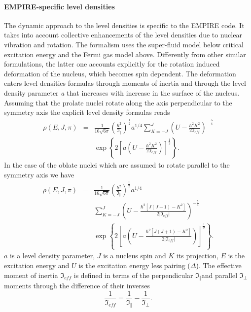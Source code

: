 \documentclass[twocolumn,amsmath,amssymb,10pt,groupedaddress,letter]{revtex4}
\begin{document}
\paragraph{EMPIRE-specific level densities}
The dynamic approach to the level densities
is specific to the EMPIRE code. It takes into account collective enhancements
of the level densities due to nuclear vibration and rotation. The
formalism uses the super-fluid model below critical excitation energy
and the Fermi gas model above. Differently from other
similar formulations, the latter one accounts explicitly for the rotation
induced deformation of the nucleus, which becomes spin dependent.
The deformation enters level densities
formulas through moments of inertia and through the level density
parameter \emph{a} that increases with increase in the surface of
the nucleus.
Assuming that the prolate nuclei rotate along the axis perpendicular
to the symmetry axis the explicit level density formulas reads
\begin{eqnarray}
\rho(E,J,\pi) & = & \frac{1}{16\sqrt{6\pi}}\left(\frac{\hbar^{2}}{\Im_{\Vert}}\right)^{\frac{1}{2}}a^{1/4}\sum_{K=-J}^{J}\left(U-\frac{\hbar^{2}K^{2}}{2\Im_{eff}}\right)^{-\frac{5}{4}}\nonumber \\
 &  & \exp\left\{ 2\left[a\left(U-\frac{\hbar^{2}K^{2}}{2\Im_{eff}}\right)\right]^{\frac{1}{2}}\right\} .\label{ro1}
\end{eqnarray}
In the case of the oblate nuclei which are assumed to rotate parallel
to the symmetry axis we have
\begin{eqnarray}
\rho(E,J,\pi) & = & \frac{1}{16\sqrt{6\pi}}\left(\frac{\hbar^{2}}{\Im_{\Vert}}\right)^{\frac{1}{2}}a^{1/4}\nonumber \\
 &  & \sum_{K=-J}^{J}\left(U-\frac{\hbar^{2}\left[J\left(J+1\right)-K^{2}\right]}{2|\Im_{eff}|}\right)^{-\frac{5}{4}}\label{ro2}\\
 &  & \exp\left\{ 2\left[a\left(U-\frac{\hbar^{2}\left[J\left(J+1\right)-K^{2}\right]}{2|\Im_{eff}|}\right)\right]^{\frac{1}{2}}\right\} .\nonumber
 \end{eqnarray}
$a$ is a level density parameter, $J$ is a
nucleus spin and $K$ its projection, $E$ is the excitation energy
and $U$ is the excitation energy less pairing ($\Delta$). The effective
moment of inertia $\Im_{eff}$ is defined in terms of the perpendicular
$\Im_{\Vert}$and parallel $\Im_{\bot}$moments through the difference
of their inverses
\begin{equation}
\frac{1}{\Im_{eff}}=\frac{1}{\Im_{\Vert}}-\frac{1}{\Im_{\bot}}.\label{mom-iner}
\end{equation}
\end{document}
